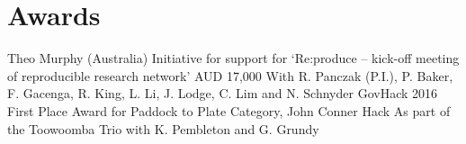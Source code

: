 \section*{Awards}
  \begin{entrylist}
			{Theo Murphy (Australia) Initiative for support for ‘Re:produce – kick-off meeting of reproducible research network’}
			{AUD 17,000}
			{With R. Panczak (P.I.), P. Baker, F. Gacenga, R. King, L. Li, J. Lodge, C. Lim and N. Schnyder}
    	{GovHack 2016 First Place Award for Paddock to Plate Category, John Conner Hack}
    	{}
    	{As part of the Toowoomba Trio with K. Pembleton and G. Grundy}
  \end{entrylist}
